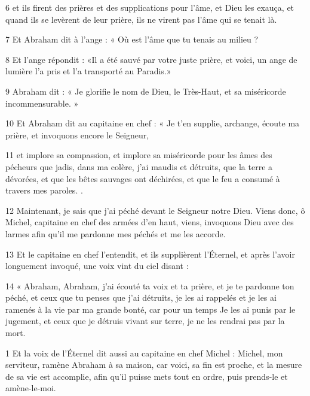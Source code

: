 \par 6 et ils firent des prières et des supplications pour l'âme, et Dieu les exauça, et quand ils se levèrent de leur prière, ils ne virent pas l'âme qui se tenait là.

\par 7 Et Abraham dit à l'ange : « Où est l'âme que tu tenais au milieu ?

\par 8 Et l'ange répondit : «Il a été sauvé par votre juste prière, et voici, un ange de lumière l'a pris et l'a transporté au Paradis.»

\par 9 Abraham dit : « Je glorifie le nom de Dieu, le Très-Haut, et sa miséricorde incommensurable. »

\par 10 Et Abraham dit au capitaine en chef : « Je t'en supplie, archange, écoute ma prière, et invoquons encore le Seigneur,

\par 11 et implore sa compassion, et implore sa miséricorde pour les âmes des pécheurs que jadis, dans ma colère, j'ai maudis et détruits, que la terre a dévorées, et que les bêtes sauvages ont déchirées, et que le feu a consumé à travers mes paroles. .

\par 12 Maintenant, je sais que j'ai péché devant le Seigneur notre Dieu. Viens donc, ô Michel, capitaine en chef des armées d'en haut, viens, invoquons Dieu avec des larmes afin qu'il me pardonne mes péchés et me les accorde.

\par 13 Et le capitaine en chef l'entendit, et ils supplièrent l'Éternel, et après l'avoir longuement invoqué, une voix vint du ciel disant :

\par 14 « Abraham, Abraham, j'ai écouté ta voix et ta prière, et je te pardonne ton péché, et ceux que tu penses que j'ai détruits, je les ai rappelés et je les ai ramenés à la vie par ma grande bonté, car pour un temps Je les ai punis par le jugement, et ceux que je détruis vivant sur terre, je ne les rendrai pas par la mort.


\par 1 Et la voix de l'Éternel dit aussi au capitaine en chef Michel : Michel, mon serviteur, ramène Abraham à sa maison, car voici, sa fin est proche, et la mesure de sa vie est accomplie, afin qu'il puisse mets tout en ordre, puis prends-le et amène-le-moi.


